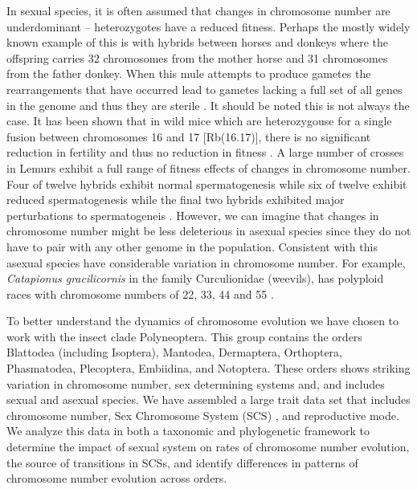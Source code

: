 In sexual species, it is often assumed that changes in chromosome number are underdominant \citep{white1973} -- heterozygotes have a reduced fitness. 
Perhaps the mostly widely known example of this is with hybrids between horses and donkeys where the offspring carries 32 chromosomes from the mother horse and 31 chromosomes from the father donkey. 
When this mule attempts to produce gametes the rearrangements that have occurred lead to gametes lacking a full set of all genes in the genome and thus they are sterile \citep{wodsedalek1916}. 
It should be noted this is not always the case.
It has been shown that in wild mice which are heterozygouse for a single fusion between chromosomes 16 and 17 [Rb(16.17)], there is no significant reduction in fertility and thus no reduction in fitness \citep{britton1990robertsonian}.
A large number of crosses in Lemurs exhibit a full range of fitness effects of changes in chromosome number.
Four of twelve hybrids exhibit normal spermatogenesis while six of twelve exhibit reduced spermatogenesis while the final two hybrids exhibited major perturbations to spermatogeneis \citep{ratomponirina1988}.   
However, we can imagine that changes in chromosome number might be less deleterious in asexual species since they do not have to pair with any other genome in the population.
Consistent with this asexual species have considerable variation in chromosome number. 
For example, \textit{Catapionus gracilicornis} in the family Curculionidae (weevils), has polyploid races with chromosome numbers of 22, 33, 44 and 55 \citep{lachowska1998}. 

To better understand the dynamics of chromosome evolution we have chosen to work with the insect clade Polyneoptera.
This group contains the orders Blattodea (including Isoptera), Mantodea, Dermaptera, Orthoptera, Phasmatodea, Plecoptera, Embiidina, and Notoptera.
These orders shows striking variation in chromosome number, sex determining systems and, and includes sexual and asexual species. 
We have assembled a large trait data set that includes chromosome number, Sex Chromosome System (SCS) , and reproductive mode.
We analyze this data in both a taxonomic and phylogenetic framework to determine the impact of sexual system on rates of chromosome number evolution, the source of transitions in SCSs, and identify differences in patterns of chromosome number evolution across orders.
 
